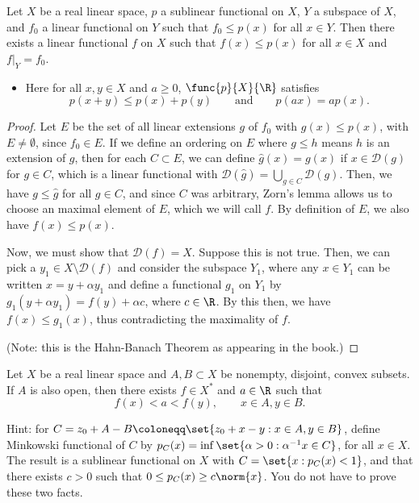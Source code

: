 \documentclass[12pt,letterpaper,twoside]{hmcpset}
\begin{document}
\begin{problem}[1]
  Let $X$ be a real linear space, $p$ a sublinear functional on $X$, $Y$ a subspace of $X$, and $f_{0}$ a linear functional on $Y$ such that $f_{0} \leq p(x)$ for all $x \in Y$.
Then there exists a linear functional $f$ on $X$ such that $f(x) \leq p(x)$ for all $x \in X$ and $f|_{Y} = f_{0}$.
\begin{itemize}
\item Here for all $x,y \in X$ and $a \geq 0$, $\func{p}{X}{\R}$ satisfies \[p(x+y) \leq p(x) + p(y) \qquad \text{and} \qquad p(ax) = ap(x).\]
\end{itemize}
\end{problem}

\begin{solution}
  \begin{proof}
    Let $E$ be the set of all linear extensions $g$ of $f_{0}$ with
    $g(x) \leq p(x)$, with $E \neq \emptyset$, since $f_{0} \in E$.
    If we define an ordering on $E$ where $g \leq h$ means $h$ is an
    extension of $g$, then for each $C \subset E$, we can define $\hat{g}(x) = g(x)$ if $x\in \mathscr{D}(g)$ for $g \in C$, which is a linear functional with $\mathscr{D}(\hat{g}) = \bigcup_{g\in C}\mathscr{D}(g)$.  
Then, we have $g \leq \hat{g}$ for all $g \in C$, and since $C$ was arbitrary, Zorn's lemma allows us to choose an maximal element of $E$, which we will call $f$.  
By definition of $E$, we also have $f(x) \leq p(x)$.

Now, we must show that $\mathscr{D}(f) = X$. Suppose this is not true.  
Then, we can pick a $y_{1} \in X\setminus\mathscr{D}(f)$ and consider the subspace $Y_{1}$, where any $x \in Y_{1}$ can be written $x=y + \alpha y_{1}$ and define a functional $g_{1}$ on $Y_{1}$ by $g_{1}(y + \alpha y_{1}) = f(y) + \alpha c$, where $c \in \R$. 
By this then, we have $f(x) \leq g_{1}(x)$, thus contradicting the maximality of $f$. 

(Note: this is the Hahn-Banach Theorem as appearing in the book.)
  \end{proof}
\end{solution}
\begin{problem}[2]
  Let $X$ be a real linear space and $A,B \subset X$ be nonempty, disjoint, convex subsets.
  If $A$ is also open, then there exists $f \in X^{*}$ and $a \in \R$ such that \[f(x) < a < f(y), \qquad x \in A, y \in B.\]
  
  Hint: for $C = z_{0} + A - B \coloneqq \set{z_{0} + x - y : x \in A, y \in B}$, define Minkowski functional of $C$ by $p_{C}(x) = \inf \set{\alpha > 0 : \alpha^{-1}x \in C}$, for all $x \in X$.
    The result is a sublinear functional on $X$ with $C = \set{x : p_{C}(x) < 1}$, and that there exists $c > 0$ such that $0 \leq p_{C}(x) \geq c\norm{x}$. 
    You do not have to prove these two facts. 
\end{problem}
\end{document}
